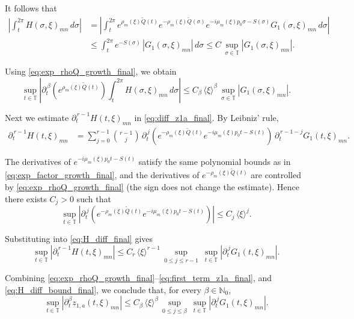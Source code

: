 \documentclass[11pt,reqno]{amsart}
\numberwithin{equation}{section}
\begin{document}
	It follows that
	\begin{align*}
		\left|\int_t^{2\pi} H(\sigma,\xi)_{mn}\,d\sigma\right|
		&=
		\left|\int_t^{2\pi} e^{\rho_m(\xi)\widetilde Q(t)}e^{-\rho_m(\xi)\widetilde Q(\sigma)}
		e^{-i\mu_m(\xi)p_0\sigma-S(\sigma)}G_1(\sigma,\xi)_{mn}\,d\sigma\right|\\
		&\le
		\int_t^{2\pi} e^{-S(\sigma)}\,|G_1(\sigma,\xi)_{mn}|\,d\sigma
		\le
		C\,\sup_{\sigma\in\mathbb{T}}|G_1(\sigma,\xi)_{mn}|.
	\end{align*}
	
	Using \eqref{eq:exp_rhoQ_growth_final}, we obtain
	\begin{equation}\label{eq:first_term_z1a_final}
		\sup_{t\in\mathbb{T}}
		\left|
		\partial_t^{\,\beta}\!\left(e^{\rho_m(\xi)\widetilde Q(t)}\right)
		\int_t^{2\pi} H(\sigma,\xi)_{mn}\,d\sigma
		\right|
		\le
		C_\beta\,\langle\xi\rangle^{\beta}\,\sup_{\sigma\in\mathbb{T}}|G_1(\sigma,\xi)_{mn}|.
	\end{equation}
	
	Next we estimate $\partial_t^{\,r-1}H(t,\xi)_{mn}$ in \eqref{eq:diff_z1a_final}. By Leibniz' rule,
	\begin{align}
		\partial_t^{\,r-1}H(t,\xi)_{mn}
		&=
		\sum_{j=0}^{r-1}\binom{r-1}{j}\,
		\partial_t^{\,j}\!\left(e^{-\rho_m(\xi)\widetilde Q(t)}e^{-i\mu_m(\xi)p_0 t-S(t)}\right)\,
		\partial_t^{\,r-1-j}G_1(t,\xi)_{mn}.\label{eq:H_diff_final}
	\end{align}
	
	The derivatives of $e^{-i\mu_m(\xi)p_0 t-S(t)}$ satisfy the same polynomial bounds as in
	\eqref{eq:exp_factor_growth_final}, and the derivatives of $e^{-\rho_m(\xi)\widetilde Q(t)}$ are controlled by
	\eqref{eq:exp_rhoQ_growth_final} (the sign does not change the estimate). Hence there exists $C_j>0$ such that
	\[
	\sup_{t\in\mathbb{T}}
	\left|
	\partial_t^{\,j}\!\left(e^{-\rho_m(\xi)\widetilde Q(t)}e^{-i\mu_m(\xi)p_0 t-S(t)}\right)
	\right|
	\le C_j\,\langle\xi\rangle^{j}.
	\]
	
	Substituting into \eqref{eq:H_diff_final} gives
	\begin{equation}\label{eq:H_diff_bound_final}
		\sup_{t\in\mathbb{T}}|\partial_t^{\,r-1}H(t,\xi)_{mn}|
		\le
		C_r\,\langle\xi\rangle^{r-1}\,
		\sup_{0\le j\le r-1}\ \sup_{t\in\mathbb{T}}|\partial_t^{\,j}G_1(t,\xi)_{mn}|.
	\end{equation}
	
	Combining \eqref{eq:exp_rhoQ_growth_final}--\eqref{eq:first_term_z1a_final},
	and \eqref{eq:H_diff_bound_final}, we conclude that, for every $\beta\in\mathbb{N}_0$,
	\begin{equation*}\label{eq:z1a_beta_bound_final}
		\sup_{t\in\mathbb{T}}|\partial_t^\beta z_{1,a}(t,\xi)_{mn}|
		\le
		C_\beta\,\langle\xi\rangle^{\beta}\,
		\sup_{0\le j\le \beta}\ \sup_{t\in\mathbb{T}}|\partial_t^{\,j}G_1(t,\xi)_{mn}|.
	\end{equation*}
	
\end{document}
